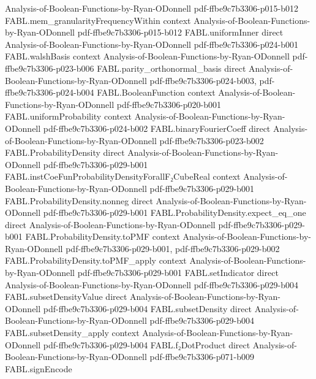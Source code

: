 \begin{theorem}
  {Analysis-of-Boolean-Functions-by-Ryan-ODonnell}
  {pdf-ffbe9c7b3306-p015-b012}
\proofstep
  {FABL.mem_granularityFrequencyWithin}
  {context}
  {Analysis-of-Boolean-Functions-by-Ryan-ODonnell}
  {pdf-ffbe9c7b3306-p015-b012}
\proofstep
  {FABL.uniformInner}
  {direct}
  {Analysis-of-Boolean-Functions-by-Ryan-ODonnell}
  {pdf-ffbe9c7b3306-p024-b001}
\proofstep
  {FABL.walshBasis}
  {context}
  {Analysis-of-Boolean-Functions-by-Ryan-ODonnell}
  {pdf-ffbe9c7b3306-p023-b006}
\proofstep
  {FABL.parity_orthonormal_basis}
  {direct}
  {Analysis-of-Boolean-Functions-by-Ryan-ODonnell}
  {pdf-ffbe9c7b3306-p024-b003,
    pdf-ffbe9c7b3306-p024-b004}
\proofstep
  {FABL.BooleanFunction}
  {context}
  {Analysis-of-Boolean-Functions-by-Ryan-ODonnell}
  {pdf-ffbe9c7b3306-p020-b001}
\proofstep
  {FABL.uniformProbability}
  {context}
  {Analysis-of-Boolean-Functions-by-Ryan-ODonnell}
  {pdf-ffbe9c7b3306-p024-b002}
\proofstep
  {FABL.binaryFourierCoeff}
  {direct}
  {Analysis-of-Boolean-Functions-by-Ryan-ODonnell}
  {pdf-ffbe9c7b3306-p023-b002}
\proofstep
  {FABL.ProbabilityDensity}
  {direct}
  {Analysis-of-Boolean-Functions-by-Ryan-ODonnell}
  {pdf-ffbe9c7b3306-p029-b001}
\proofstep
  {FABL.instCoeFunProbabilityDensityForallF₂CubeReal}
  {context}
  {Analysis-of-Boolean-Functions-by-Ryan-ODonnell}
  {pdf-ffbe9c7b3306-p029-b001}
\proofstep
  {FABL.ProbabilityDensity.nonneg}
  {direct}
  {Analysis-of-Boolean-Functions-by-Ryan-ODonnell}
  {pdf-ffbe9c7b3306-p029-b001}
\proofstep
  {FABL.ProbabilityDensity.expect_eq_one}
  {direct}
  {Analysis-of-Boolean-Functions-by-Ryan-ODonnell}
  {pdf-ffbe9c7b3306-p029-b001}
\proofstep
  {FABL.ProbabilityDensity.toPMF}
  {context}
  {Analysis-of-Boolean-Functions-by-Ryan-ODonnell}
  {pdf-ffbe9c7b3306-p029-b001,
    pdf-ffbe9c7b3306-p029-b002}
\proofstep
  {FABL.ProbabilityDensity.toPMF_apply}
  {context}
  {Analysis-of-Boolean-Functions-by-Ryan-ODonnell}
  {pdf-ffbe9c7b3306-p029-b001}
\proofstep
  {FABL.setIndicator}
  {direct}
  {Analysis-of-Boolean-Functions-by-Ryan-ODonnell}
  {pdf-ffbe9c7b3306-p029-b004}
\proofstep
  {FABL.subsetDensityValue}
  {direct}
  {Analysis-of-Boolean-Functions-by-Ryan-ODonnell}
  {pdf-ffbe9c7b3306-p029-b004}
\proofstep
  {FABL.subsetDensity}
  {direct}
  {Analysis-of-Boolean-Functions-by-Ryan-ODonnell}
  {pdf-ffbe9c7b3306-p029-b004}
\proofstep
  {FABL.subsetDensity_apply}
  {context}
  {Analysis-of-Boolean-Functions-by-Ryan-ODonnell}
  {pdf-ffbe9c7b3306-p029-b004}
\proofstep
  {FABL.f₂DotProduct}
  {direct}
  {Analysis-of-Boolean-Functions-by-Ryan-ODonnell}
  {pdf-ffbe9c7b3306-p071-b009}
\proofstep
  {FABL.signEncode}

\end{theorem}

